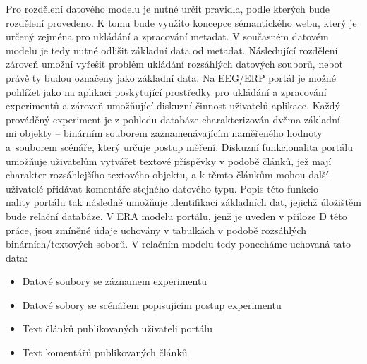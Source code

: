 \documentclass{projekt}
\begin{document}
Pro rozdělení datového modelu je nutné určit pravidla, podle kterých bude rozdělení provedeno. K tomu bude využito koncepce sémantického webu, který je určený zejména pro ukládání a zpracování metadat. V současném datovém modelu je tedy nutné odlišit základní data od metadat. Následující rozdělení zároveň umožní vyřešit problém ukládání rozsáhlých datových souborů, neboť právě ty budou označeny jako základní data. Na EEG/ERP portál je možné pohlížet jako na aplikaci poskytující prostředky pro ukládání a zpracování experimentů a zároveň umožňující diskuzní činnost uživatelů aplikace. Každý prováděný experiment je z pohledu databáze charakterizován dvěma základní-\\mi objekty – binárním souborem zaznamenávajícím naměřeného hodnoty a~souborem scénáře, který určuje postup měření. Diskuzní funkcionalita portálu umožňuje uživatelům vytvářet textové příspěvky v podobě článků, jež mají charakter rozsáhlejšího textového objektu, a k těmto článkům mohou další uživatelé přidávat komentáře stejného datového typu. Popis této funkcio-\\nality portálu tak následně umožňuje identifikaci základních dat, jejichž úložištěm bude relační databáze. V ERA modelu portálu, jenž je uveden v příloze D této práce, jsou zmíněné údaje uchovány v tabulkách v podobě rozsáhlých binárních/textových soborů. V relačním modelu tedy ponecháme uchovaná tato data: 



\begin{itemize}
\item Datové soubory se záznamem experimentu
\item Datové sobory se scénářem popisujícím postup experimentu
\item Text článků publikovaných uživateli portálu
\item Text komentářů publikovaných článků
\end{itemize}
\end{document}
